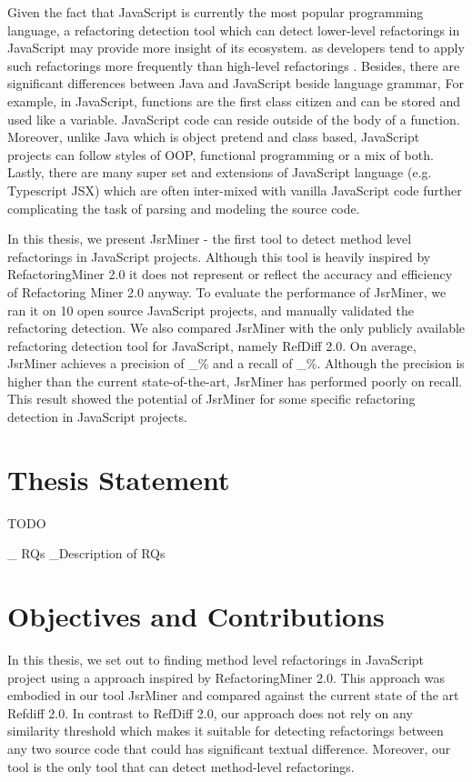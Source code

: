 \documentclass[letterpaper,12pt,onecolumn,final]{report}
\begin{document}
Given the fact that JavaScript is currently the most popular programming language, a refactoring detection tool which can detect lower-level refactorings in JavaScript may provide more insight of its ecosystem. as developers tend to apply such refactorings more frequently than high-level refactorings \cite{MurphyHill2012}. Besides, there are significant differences between Java and JavaScript beside language grammar, For example, in JavaScript,  functions are the first class citizen and can be stored and used like a variable. JavaScript code can reside outside of the body of a function. Moreover, unlike Java which is object pretend and class based, JavaScript projects can follow styles of OOP, functional programming or a mix of both. Lastly, there are many  super set and extensions of JavaScript language (e.g. Typescript JSX) which are often inter-mixed with vanilla JavaScript code further complicating the task of parsing and modeling the source code.

In this thesis, we present JsrMiner - the first tool to detect method level refactorings in JavaScript projects. Although this tool is heavily inspired by RefactoringMiner 2.0 it does not represent or reflect the accuracy and efficiency of Refactoring Miner 2.0 anyway. To evaluate the performance of JsrMiner, we ran it on 10 open source JavaScript projects, and manually validated the refactoring detection. We also compared JsrMiner with the only publicly available refactoring detection tool for JavaScript, namely RefDiff 2.0. On average, JsrMiner achieves a precision of \_\% and a recall of \_\%. Although the precision is higher than the current state-of-the-art, JsrMiner has performed poorly on recall.  This result showed the potential of JsrMiner for some specific refactoring detection in JavaScript projects.

\section{Thesis Statement}

TODO

\_ RQs
\_Description of RQs

\section{Objectives and Contributions}
In this thesis, we set out to finding method level refactorings in JavaScript project using a approach inspired by RefactoringMiner 2.0. This approach was embodied in our tool JsrMiner and compared against the current state of the art Refdiff 2.0. In contrast to RefDiff 2.0, our approach does not rely on any similarity threshold which makes it suitable for detecting refactorings between any two source code that could has significant textual difference. Moreover, our tool is the only tool that can detect method-level refactorings. 
\end{document}
